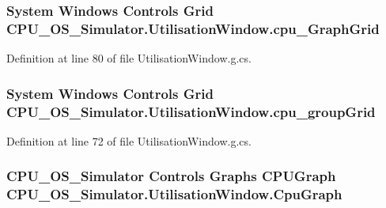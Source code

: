\subsubsection[{cpu\+\_\+\+Graph\+Grid}]{\setlength{\rightskip}{0pt plus 5cm}System Windows Controls Grid C\+P\+U\+\_\+\+O\+S\+\_\+\+Simulator.\+Utilisation\+Window.\+cpu\+\_\+\+Graph\+Grid\hspace{0.3cm}{\ttfamily [package]}}\label{class_c_p_u___o_s___simulator_1_1_utilisation_window_a89970f438dcb79f852cd63ee558c9388}


Definition at line 80 of file Utilisation\+Window.\+g.\+cs.

\hypertarget{class_c_p_u___o_s___simulator_1_1_utilisation_window_a46aa403e5d65d2a7fb4d2f242ab34d57}{}
\subsubsection[{cpu\+\_\+group\+Grid}]{\setlength{\rightskip}{0pt plus 5cm}System Windows Controls Grid C\+P\+U\+\_\+\+O\+S\+\_\+\+Simulator.\+Utilisation\+Window.\+cpu\+\_\+group\+Grid\hspace{0.3cm}{\ttfamily [package]}}\label{class_c_p_u___o_s___simulator_1_1_utilisation_window_a46aa403e5d65d2a7fb4d2f242ab34d57}


Definition at line 72 of file Utilisation\+Window.\+g.\+cs.

\hypertarget{class_c_p_u___o_s___simulator_1_1_utilisation_window_a06d7108831a173a5342a06d491a15ce0}{}
\subsubsection[{Cpu\+Graph}]{\setlength{\rightskip}{0pt plus 5cm}C\+P\+U\+\_\+\+O\+S\+\_\+\+Simulator Controls Graphs {\bf C\+P\+U\+Graph} C\+P\+U\+\_\+\+O\+S\+\_\+\+Simulator.\+Utilisation\+Window.\+Cpu\+Graph\hspace{0.3cm}{\ttfamily [package]}}\label{class_c_p_u___o_s___simulator_1_1_utilisation_window_a06d7108831a173a5342a06d491a15ce0}


